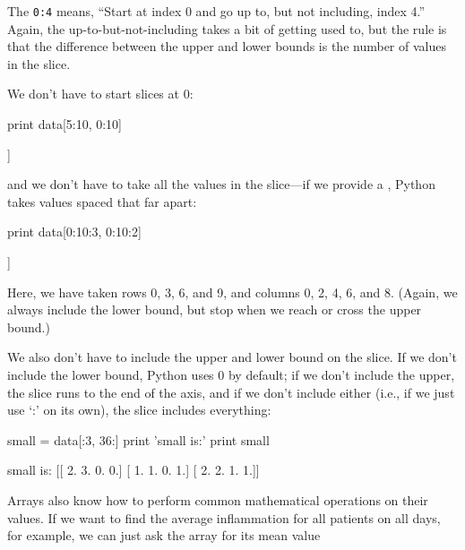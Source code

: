 \documentclass{book}
\begin{document}
The  \texttt{0:4} means, ``Start at index 0 and
go up to, but not including, index 4.'' Again, the
up-to-but-not-including takes a bit of getting used to, but the rule is
that the difference between the upper and lower bounds is the number of
values in the slice.

We don't have to start slices at 0:

\begin{VerbIn}
print data[5:10, 0:10]
\end{VerbIn}

\begin{VerbOut}
[[ 0.  0.  1.  2.  2.  4.  2.  1.  6.  4.]
 [ 0.  0.  2.  2.  4.  2.  2.  5.  5.  8.]
 [ 0.  0.  1.  2.  3.  1.  2.  3.  5.  3.]
 [ 0.  0.  0.  3.  1.  5.  6.  5.  5.  8.]
 [ 0.  1.  1.  2.  1.  3.  5.  3.  5.  8.]]
\end{VerbOut}

and we don't have to take all the values in the slice---if we provide a
, Python takes values spaced that far apart:

\begin{VerbIn}
print data[0:10:3, 0:10:2]
\end{VerbIn}

\begin{VerbOut}
[[ 0.  1.  1.  4.  8.]
 [ 0.  2.  4.  2.  6.]
 [ 0.  2.  4.  2.  5.]
 [ 0.  1.  1.  5.  5.]]
\end{VerbOut}

Here, we have taken rows 0, 3, 6, and 9, and columns 0, 2, 4, 6, and 8.
(Again, we always include the lower bound, but stop when we reach or
cross the upper bound.)

We also don't have to include the upper and lower bound on the slice. If
we don't include the lower bound, Python uses 0 by default; if we don't
include the upper, the slice runs to the end of the axis, and if we
don't include either (i.e., if we just use `:' on its own), the slice
includes everything:

\begin{VerbIn}
small = data[:3, 36:]
print 'small is:'
print small
\end{VerbIn}

\begin{VerbOut}
small is:
[[ 2.  3.  0.  0.]
 [ 1.  1.  0.  1.]
 [ 2.  2.  1.  1.]]
\end{VerbOut}

Arrays also know how to perform common mathematical operations on their
values. If we want to find the average inflammation for all patients on
all days, for example, we can just ask the array for its mean value
\end{document}
